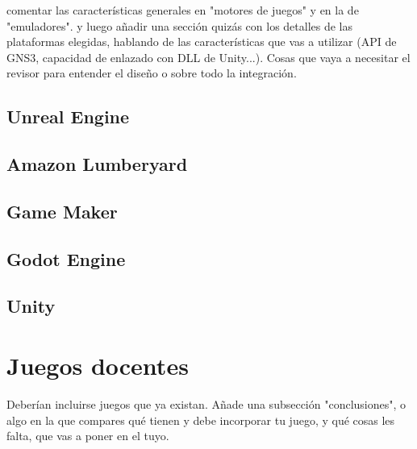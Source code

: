 comentar las características generales en "motores de juegos" y en la de "emuladores". y luego añadir una sección quizás con los detalles de las plataformas elegidas, hablando de las características que vas a utilizar (API de GNS3, capacidad de enlazado con DLL de Unity...). Cosas que vaya a necesitar el revisor para entender el diseño o sobre todo la integración.

\subsection{Unreal Engine}

\subsection{Amazon Lumberyard}

\subsection{Game Maker}

\subsection{Godot Engine}

\subsection{Unity}

\section{Juegos docentes}
Deberían incluirse juegos que ya existan. Añade una subsección "conclusiones", o algo en la que compares qué tienen y debe incorporar tu juego, y qué cosas les falta, que vas a poner en el tuyo.